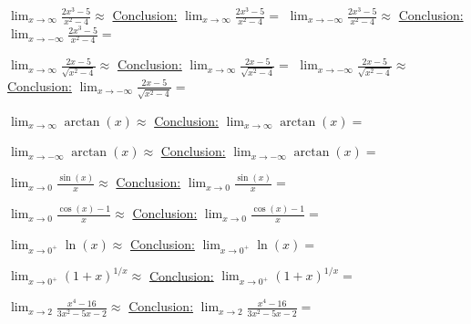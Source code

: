\documentclass[]{exam}
\numberwithin{equation}{section}
\begin{document}
\begin{questions}
\begin{parts}
\begin{subparts}
	\subpart $\displaystyle \lim_{x\to \infty} \frac{2x^3 - 5}{x^2-4}\approx$ \hspace{7.44cm} \underline{Conclusion:} $\displaystyle \lim_{x\to \infty} \frac{2x^3 - 5}{x^2-4} = $ \vfill
	\subpart $\displaystyle \lim_{x\to -\infty} \frac{2x^3 - 5}{x^2-4}\approx$ \hspace{7.1cm} \underline{Conclusion:} $\displaystyle \lim_{x\to -\infty} \frac{2x^3 - 5}{x^2-4} = $ \vfill

	\subpart $\displaystyle \lim_{x\to \infty} \frac{2x - 5}{\sqrt{x^2-4}}\approx$ \hspace{7.44cm} \underline{Conclusion:} $\displaystyle \lim_{x\to \infty} \frac{2x - 5}{\sqrt{x^2-4}} = $ \vfill
	\subpart $\displaystyle \lim_{x\to -\infty} \frac{2x - 5}{\sqrt{x^2-4}}\approx$ \hspace{7.1cm} \underline{Conclusion:} $\displaystyle \lim_{x\to -\infty} \frac{2x - 5}{\sqrt{x^2-4}} = $ \vfill


	\subpart $\displaystyle \lim_{x\to \infty} \arctan(x) \approx$ \hspace{7.4cm} \underline{Conclusion:} $\displaystyle \lim_{x\to \infty} \arctan(x) = $ \vfill

	\subpart $\displaystyle \lim_{x\to -\infty} \arctan(x) \approx$ \hspace{7.2cm} \underline{Conclusion:} $\displaystyle \lim_{x\to -\infty}\arctan(x) = $ \vfill

	\pagebreak

	\subpart $\displaystyle \lim_{x\to 0} \frac{\sin(x)}{x}\approx$ \hspace{7.2cm} \underline{Conclusion:} $\displaystyle \lim_{x\to 0} \frac{\sin(x)}{x}= $ \vfill

	\subpart $\displaystyle \lim_{x\to 0} \frac{\cos(x)-1}{x}\approx$ \hspace{6.8cm} \underline{Conclusion:} $\displaystyle \lim_{x\to 0} \frac{\cos(x)-1}{x}= $ \vfill
	
	\subpart $\displaystyle \lim_{x\to 0^+} \ln(x)\approx$ \hspace{7.3cm} \underline{Conclusion:} $\displaystyle \lim_{x\to 0^+}  \ln(x) = $ \vfill	
	
	\subpart $\displaystyle \lim_{x\to 0^+} \left(1 + x\right)^{1/x}\approx$ \hspace{5.9cm} \underline{Conclusion:} $\displaystyle \lim_{x\to 0^+} \left(1 + x\right)^{1/x} =$ \vfill	
	

	\subpart $\displaystyle \lim_{x\to 2} \frac{x^4 - 16}{3x^2 - 5x - 2}\approx$ \hspace{5.8cm} \underline{Conclusion:} $\displaystyle \lim_{x\to 2}\frac{x^4 - 16}{3x^2 - 5x - 2}= $ \vfill


\end{subparts}
\end{parts}
\end{questions}
\end{document}
